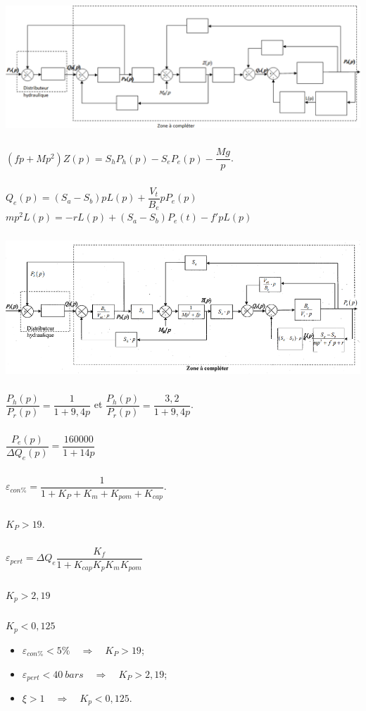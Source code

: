 \documentclass[10pt,fleqn]{article} %
\begin{document}
\begin{center}
\includegraphics[width=.8\linewidth]{images_02/fig_10}
\end{center}

\setcounter{exo}{0}

\newpage 

\begin{multicols}{2}
\subparagraph{} $\left(fp + Mp^2\right) Z(p)=S_hP_h(p)-S_eP_e(p)-\dfrac{Mg}{p}$.

\subparagraph{}
$Q_e(p)=\left(S_a-S_b \right)pL(p) + \dfrac{V_t}{B_e}p P_e(p)$
$mp^2 L(p)=-rL(p)+\left( S_a-S_b\right)P_e(t) - f' pL(p)$

\subparagraph{}
\begin{center}
\includegraphics[width=\linewidth]{images_02/cor_01}
\end{center}


\subparagraph{}
$ \dfrac{P_h(p)}{P_r(p)}=\dfrac{1}{1+9,4 p} $ et 
$ \dfrac{P_h(p)}{P_r(p)}=\dfrac{3,2}{1+9,4 p} $.

\subparagraph{}
$ \dfrac{P_e(p)}{\Delta Q_e(p)}=\dfrac{160000}{1+14 p} $

\subparagraph{}
$\varepsilon_{con\%}=\dfrac{1}{1+K_P+K_m+K_{pom}+K_{cap}}$.

\subparagraph{}
$K_P>19$.

\subparagraph{}
$\varepsilon_{pert}=\Delta Q_e \dfrac{K_f}{1+K_{cap}K_pK_mK_{pom}}$

\subparagraph{}
$K_p>2,19$

\subparagraph{}
$K_p<0,125$

\begin{itemize}
\item $\varepsilon_{con\%}<5\%\quad \Rightarrow \quad  K_P>19$;
\item $\varepsilon_{pert}<\SI{40}{bars} \quad \Rightarrow \quad  K_P>2,19$;
\item $\xi>1 \quad \Rightarrow  \quad K_p < 0,125$.
\end{itemize}


\end{multicols}
\end{document}
